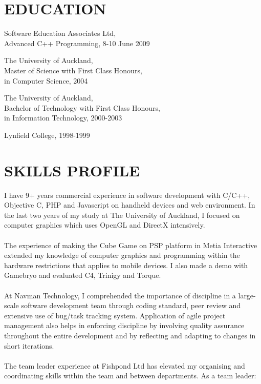 \begin{resume}
\vspace{0.1in}

\section{EDUCATION}
\vspace{0.1in} 
Software Education Associates Ltd,\\
Advanced C++ Programming, 8-10 June 2009

The University of Auckland,\\
Master of Science with First Class Honours,\\
in Computer Science, 2004 
 
The University of Auckland,\\
Bachelor of Technology with First Class Honours,\\
in Information Technology, 2000-2003 
 
Lynfield College, 1998-1999 
 
\section{SKILLS PROFILE} 
\vspace{0.1in}

I have 9+ years commercial experience in software development with C/C++, Objective C, PHP and Javascript on handheld devices and web environment. In the last two years of my study at The University of Auckland, I focused on computer graphics which uses OpenGL and DirectX intensively.\\\\
The experience of making the Cube Game on PSP platform in Metia Interactive extended my knowledge of computer graphics and programming within the hardware restrictions that applies to mobile devices. I also made a demo with Gamebryo and evaluated C4, Trinigy and Torque.\\\\
At Navman Technology, I comprehended the importance of discipline in a large-scale software development team through coding standard, peer review and extensive use of bug/task tracking system. Application of agile project management also helps in enforcing discipline by involving quality assurance throughout the entire development and by reflecting and adapting to changes in short iterations.\\\\
The team leader experience at Fishpond Ltd has elevated my organising and coordinating skills within the team and between departments. As a team leader: 


\end{resume}
